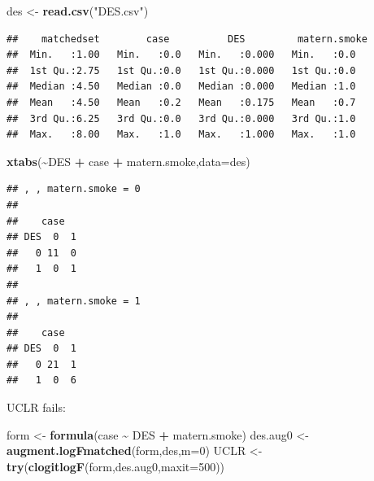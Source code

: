 \documentclass[
]{article}
\newenvironment{Shaded}{\begin{snugshade}}{\end{snugshade}}
\newcommand{\AttributeTok}[1]{\textcolor[rgb]{0.13,0.29,0.53}{#1}}
\newcommand{\CommentTok}[1]{\textcolor[rgb]{0.56,0.35,0.01}{\textit{#1}}}
\newcommand{\DecValTok}[1]{\textcolor[rgb]{0.00,0.00,0.81}{#1}}
\newcommand{\FunctionTok}[1]{\textcolor[rgb]{0.13,0.29,0.53}{\textbf{#1}}}
\newcommand{\NormalTok}[1]{#1}
\newcommand{\OtherTok}[1]{\textcolor[rgb]{0.56,0.35,0.01}{#1}}
\newcommand{\SpecialCharTok}[1]{\textcolor[rgb]{0.81,0.36,0.00}{\textbf{#1}}}
\newcommand{\StringTok}[1]{\textcolor[rgb]{0.31,0.60,0.02}{#1}}
\begin{document}
\begin{Shaded}
\begin{Highlighting}[]
\NormalTok{des }\OtherTok{\textless{}{-}} \FunctionTok{read.csv}\NormalTok{(}\StringTok{"DES.csv"}\NormalTok{)}
\end{Highlighting}
\end{Shaded}

\begin{Shaded}
\end{Shaded}

\begin{verbatim}
##    matchedset        case          DES         matern.smoke
##  Min.   :1.00   Min.   :0.0   Min.   :0.000   Min.   :0.0  
##  1st Qu.:2.75   1st Qu.:0.0   1st Qu.:0.000   1st Qu.:0.0  
##  Median :4.50   Median :0.0   Median :0.000   Median :1.0  
##  Mean   :4.50   Mean   :0.2   Mean   :0.175   Mean   :0.7  
##  3rd Qu.:6.25   3rd Qu.:0.0   3rd Qu.:0.000   3rd Qu.:1.0  
##  Max.   :8.00   Max.   :1.0   Max.   :1.000   Max.   :1.0
\end{verbatim}

\begin{Shaded}
\begin{Highlighting}[]
\FunctionTok{xtabs}\NormalTok{(}\SpecialCharTok{\textasciitilde{}}\NormalTok{DES }\SpecialCharTok{+}\NormalTok{ case }\SpecialCharTok{+}\NormalTok{ matern.smoke,}\AttributeTok{data=}\NormalTok{des)}
\end{Highlighting}
\end{Shaded}

\begin{verbatim}
## , , matern.smoke = 0
## 
##    case
## DES  0  1
##   0 11  0
##   1  0  1
## 
## , , matern.smoke = 1
## 
##    case
## DES  0  1
##   0 21  1
##   1  0  6
\end{verbatim}

UCLR fails:

\begin{Shaded}
\begin{Highlighting}[]
\NormalTok{form }\OtherTok{\textless{}{-}} \FunctionTok{formula}\NormalTok{(case }\SpecialCharTok{\textasciitilde{}}\NormalTok{ DES }\SpecialCharTok{+}\NormalTok{ matern.smoke)}
\NormalTok{des.aug0 }\OtherTok{\textless{}{-}} \FunctionTok{augment.logFmatched}\NormalTok{(form,des,}\AttributeTok{m=}\DecValTok{0}\NormalTok{)}
\NormalTok{UCLR }\OtherTok{\textless{}{-}} \FunctionTok{try}\NormalTok{(}\FunctionTok{clogitlogF}\NormalTok{(form,des.aug0,}\AttributeTok{maxit=}\DecValTok{500}\NormalTok{))}
\end{Highlighting}
\end{Shaded}
\end{document}
